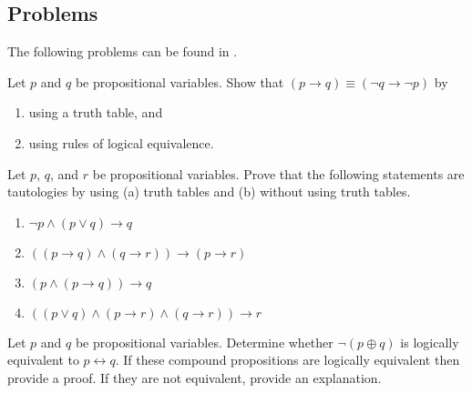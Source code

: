 \documentclass[../notes.tex]{subfiles}
\begin{document}
\subsection{Problems}
The following problems can be found in \cite{rosen}.
\begin{homework}
    Let $p$ and $q$ be propositional variables. Show that $(p\to q)\equiv(\lnot q\to\lnot p)$ by
    \begin{enumerate}[label=(\alph*)]
        \item using a truth table, and
        \item using rules of logical equivalence.
    \end{enumerate}
\end{homework}
\begin{homework}
    Let $p$, $q$, and $r$ be propositional variables. Prove that the following statements are tautologies by using (a) truth tables and (b) without using truth tables.
    \begin{enumerate}[label=(\alph*)]
        \item $\neg p \land (p \lor q) \rightarrow q$
        \item $((p \rightarrow q) \land (q \rightarrow r)) \rightarrow (p \rightarrow r) $
        \item $(p \land (p \rightarrow q)) \rightarrow q$
        \item $((p \lor q) \land (p \rightarrow r) \land (q \rightarrow r)) \rightarrow r $
    \end{enumerate}
\end{homework}
\begin{homework} 
    Let $p$ and $q$ be propositional variables. Determine whether $\neg (p \oplus q)$ is logically equivalent to $p \leftrightarrow q$. If these compound propositions are logically equivalent then provide a proof. If they are not equivalent, provide an explanation.
\end{homework}
\end{document}
